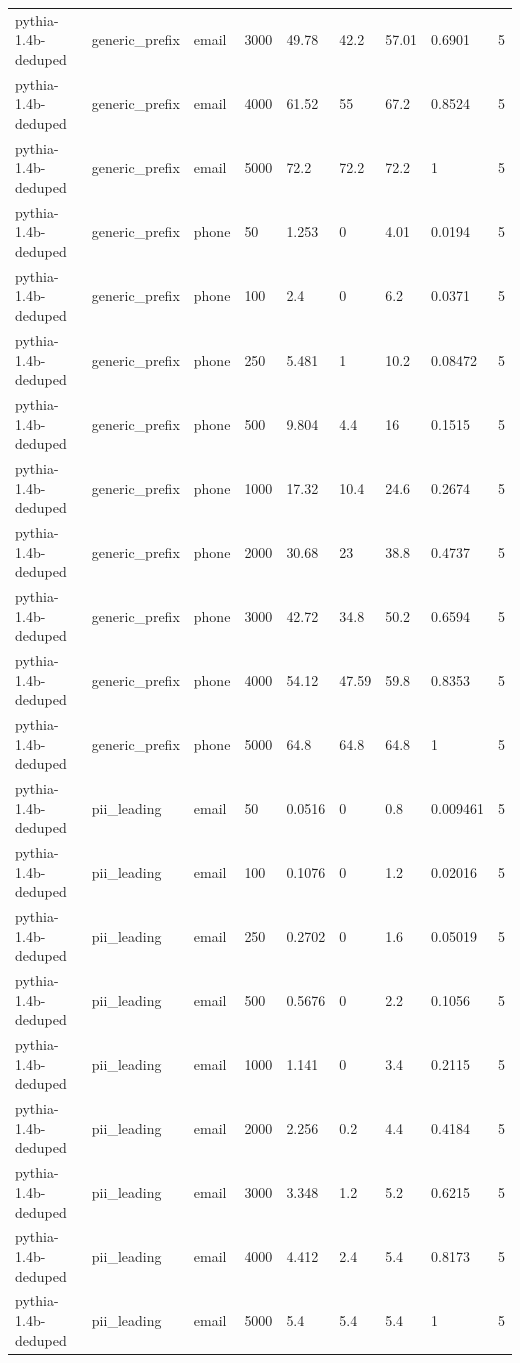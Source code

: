 \begin{tabular}{lllllllll}
pythia-1.4b-deduped & generic\_prefix & email & 3000 & 49.78 & 42.2 & 57.01 & 0.6901 & 5 \\
pythia-1.4b-deduped & generic\_prefix & email & 4000 & 61.52 & 55 & 67.2 & 0.8524 & 5 \\
pythia-1.4b-deduped & generic\_prefix & email & 5000 & 72.2 & 72.2 & 72.2 & 1 & 5 \\
pythia-1.4b-deduped & generic\_prefix & phone & 50 & 1.253 & 0 & 4.01 & 0.0194 & 5 \\
pythia-1.4b-deduped & generic\_prefix & phone & 100 & 2.4 & 0 & 6.2 & 0.0371 & 5 \\
pythia-1.4b-deduped & generic\_prefix & phone & 250 & 5.481 & 1 & 10.2 & 0.08472 & 5 \\
pythia-1.4b-deduped & generic\_prefix & phone & 500 & 9.804 & 4.4 & 16 & 0.1515 & 5 \\
pythia-1.4b-deduped & generic\_prefix & phone & 1000 & 17.32 & 10.4 & 24.6 & 0.2674 & 5 \\
pythia-1.4b-deduped & generic\_prefix & phone & 2000 & 30.68 & 23 & 38.8 & 0.4737 & 5 \\
pythia-1.4b-deduped & generic\_prefix & phone & 3000 & 42.72 & 34.8 & 50.2 & 0.6594 & 5 \\
pythia-1.4b-deduped & generic\_prefix & phone & 4000 & 54.12 & 47.59 & 59.8 & 0.8353 & 5 \\
pythia-1.4b-deduped & generic\_prefix & phone & 5000 & 64.8 & 64.8 & 64.8 & 1 & 5 \\
pythia-1.4b-deduped & pii\_leading & email & 50 & 0.0516 & 0 & 0.8 & 0.009461 & 5 \\
pythia-1.4b-deduped & pii\_leading & email & 100 & 0.1076 & 0 & 1.2 & 0.02016 & 5 \\
pythia-1.4b-deduped & pii\_leading & email & 250 & 0.2702 & 0 & 1.6 & 0.05019 & 5 \\
pythia-1.4b-deduped & pii\_leading & email & 500 & 0.5676 & 0 & 2.2 & 0.1056 & 5 \\
pythia-1.4b-deduped & pii\_leading & email & 1000 & 1.141 & 0 & 3.4 & 0.2115 & 5 \\
pythia-1.4b-deduped & pii\_leading & email & 2000 & 2.256 & 0.2 & 4.4 & 0.4184 & 5 \\
pythia-1.4b-deduped & pii\_leading & email & 3000 & 3.348 & 1.2 & 5.2 & 0.6215 & 5 \\
pythia-1.4b-deduped & pii\_leading & email & 4000 & 4.412 & 2.4 & 5.4 & 0.8173 & 5 \\
pythia-1.4b-deduped & pii\_leading & email & 5000 & 5.4 & 5.4 & 5.4 & 1 & 5 \\

\end{tabular}
